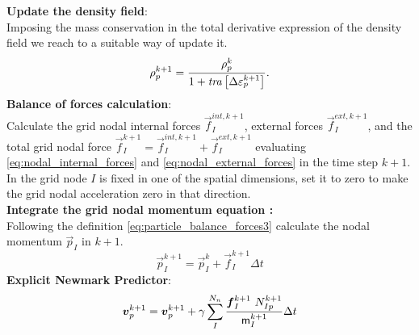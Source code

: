 \begin{algorithm}
\begin{algorithmic}[1]
  \STATE \textbf{Update the density field}:\\
  Imposing the mass conservation in the total derivative expression of
  the density field we reach to a suitable way of update it.
  \begin{equation*}
    \rho_p^{k+1} = \frac{\rho_p^k}{1 + \mathit{tra}\left[\Delta\mathsf{\varepsilon}_{p}^{k+1}\right]}.
  \end{equation*}
  \STATE \textbf{Balance of forces calculation}:\\
  Calculate the grid nodal internal forces $\vec{f}_{I}^{int,k+1}$, external
  forces $\vec{f}_{I}^{ext,k+1}$, and the total grid nodal force $\vec{f}_{I}^{k+1} =
  \vec{f}_{I}^{int,k+1} + \vec{f}_{I}^{ext,k+1}$ evaluating
  \eqref{eq:nodal_internal_forces} and
  \eqref{eq:nodal_external_forces} in the time step $k+1$. In the
  grid node $I$ is fixed in one of the spatial dimensions, set it to
  zero to make the grid nodal acceleration zero in that direction.\\
  \STATE \textbf{Integrate the grid nodal momentum equation :}\\
  Following the definition \eqref{eq:particle_balance_forces3}
  calculate the nodal momentum $\vec{p}_{I}$ in $k+1$. 
  \begin{equation*}
    \vec{p}_{I}^{k+1} = \vec{p}_{I}^{k} + \vec{f}_{I}^{k+1}\Delta t
  \end{equation*}
  \STATE \textbf{Explicit Newmark Predictor}:
  \begin{equation*}
    \vec{v}_{p}^{k+1} = \vec{v}_{p}^{k+1} +
    \gamma \sum^{N_n}_{I}\frac{\vec{f}_{I}^{k+1}\ N_{Ip}^{k+1}}{\tens{m}_I^{k+1}}\Delta t  
  \end{equation*}
\end{algorithmic}
\end{algorithm} 

